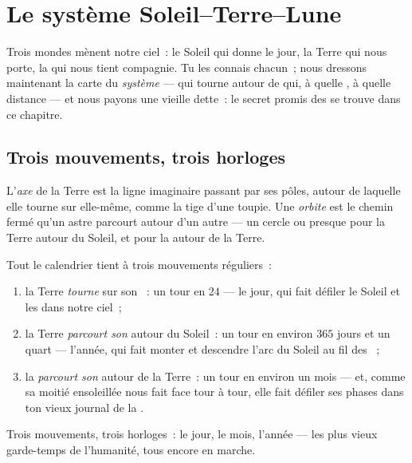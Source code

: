 \chapter{Le système Soleil--Terre--Lune}\label{ch:g6:sun-earth-moon}

Trois mondes mènent notre ciel~: le Soleil qui donne le jour, la
Terre qui nous porte, la  qui nous tient compagnie. Tu les
connais chacun~; nous dressons maintenant la carte du \emph{système}
--- qui tourne autour de qui, à quelle , à quelle distance ---
et nous payons une vieille dette~: le secret promis des  se
trouve dans ce chapitre.

\section{Trois mouvements, trois horloges}

\begin{definition}\label{def:g6:sun-earth-moon:axisorbit}
L'\emph{axe} de la Terre est la ligne imaginaire passant
par ses pôles, autour de laquelle elle tourne sur elle-même, comme la
tige d'une toupie. Une \emph{orbite} est le chemin
fermé qu'un astre parcourt autour d'un autre --- un cercle ou presque
pour la Terre autour du Soleil, et pour la  autour de la Terre.
\end{definition}

\begin{proposition}\label{prop:g6:sun-earth-moon:motions}
Tout le calendrier tient à trois mouvements réguliers~:
\begin{enumerate}
  \item la Terre \emph{tourne} sur son ~: un tour en $24$
         --- le jour, qui fait défiler le Soleil et les
         dans notre ciel~;
  \item la Terre \emph{parcourt son } autour du Soleil~: un
        tour en environ $365$ jours et un quart --- l'année, qui
        fait monter et descendre l'arc du Soleil au fil des
        ~;
  \item la  \emph{parcourt son } autour de la Terre~: un
        tour en environ un mois --- et, comme sa moitié ensoleillée
        nous fait face tour à tour, elle fait défiler ses phases
        dans ton vieux journal de la .
\end{enumerate}
Trois mouvements, trois horloges~: le jour, le mois, l'année --- les
plus vieux garde-temps de l'humanité, tous encore en marche.
\end{proposition}


